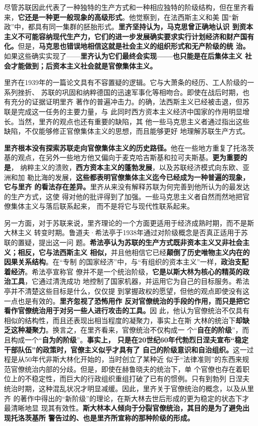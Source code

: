 尽管苏联因此代表了一种独特的生产方式和一种相应独特的阶级结构，但在里齐看
来，\textbf{它还是一种更一般现象的高级形式}。他觉察到，在法西斯主义和美
国“新政”中，都具有同一集群的胚胎形式。\textbf{里齐坚持认为，马克思曾正确地认识
  到资本主义不可能容纳现代生产力，它们的进一步发展确实要求实行计划经济和财产国有
  化。}但是，\textbf{马克思也错误地相信这就是社会主义的组织形式和无产阶级的统
  治。}如果这些确实实现了——\textbf{里齐认为它们最终会实现——也只能是在后集体主义
  社会才能做到；后资本主义社会就是官僚集体主义。}

里齐在1939年的一篇论文具有不容置疑的逻辑。它与大萧条的经历、工人阶级的一系列挫折、
苏联的巩固和纳粹德国的迅速军事化等相吻合。即使在战后时期，也有充分的证据证明里齐
著作的普遍冲击力。的确，法西斯主义已经被击退，但苏联是完成这一任务的主要力量，与
此同时西方资本主义经济中国家的作用明显增长。当然，里齐的观点也还有重要的缺陷，其
他一些马克思主义者通过指出这些缺陷，不仅能够修正官僚集体主义的思想，而且能够更好
地理解苏联生产方式。

\textbf{里齐根本没有探索苏联走向官僚集体主义的历史路径。}他在一些地方重复了托洛茨
基的观点，在另外一些地方他又偏向于麦克哈吉斯基和拉可夫斯基。\textbf{更为重要的是}，
纳粹主义的溃败，\textbf{西方资本主义的蓬勃发展}，以及苏联经济模式向东欧、亚洲和加
勒比海的发展，\textbf{这些都表明官僚集体主义迄今已经成为一种普遍的现象，它与里齐
  的看法存在差异。}里齐从来没有解释苏联为何完善到他所认为的最发达的生产方式，这使
得对他的批评得到了加强。一些马克思主义者自然而然地把官僚集体主义与落后联系起来，
而不是将它与现代性联系起来。

另一方面，对于苏联来说，里齐理论的一个方面更适用于经济成熟时期，而不是斯大林主义
转变时期。鲁道夫·希法亭于1938年通过对阶级概念是否真正适用于苏联的置疑，提出这一问
题。\textbf{希法亭认为苏联的生产方式既非资本主义又非社会主义；相反，它与法西斯主义
  相似，}并且他相信它已经\textbf{颠倒了历史唯物主义内在的因果关系结构}。在“专制
的国家经济”中，与“有组织的资本主义”一样，\textbf{政治支配着经济}。希法亭宣称官
僚并不是一个统治阶级，\textbf{它是以斯大林为核心的精英的政治工具}，它通过清洗成功
地控制了国家机器，并运用它为自己的目标服务。希法亭并不清楚这些目标是什么，仅仅提
到掌握政权的愿望，但他的观点即使没有这一点也是有效的。\textbf{里齐忽视了恐怖用作
  反对官僚统治的手段的作用，而只是把它看作官僚统治用于对另一些人进行攻击的工具。}因
此，他认为官僚统治不仅具有相似的结构性，而且还表现出相当程度的凝聚力，事实上在斯
大林的统治下\textbf{却缺乏这种凝聚力}。换言之，在里齐看来，官僚统治不仅构成一
个“\textbf{自在的阶级}”，而且构成一个“\textbf{自为的阶级}”。\textbf{事实上，
  只是在20世纪60年代勃烈日涅夫宣布“稳定干部队伍”的政策时，官僚主义似乎才具有了
  自己的阶级意识和自治组织。}这一过程是从50年代非斯大林化开始的，当时创立了某种近
似于“法律准则”的东西来规范官僚统治内部的分歧。但是，即使在赫鲁晓夫的统治下，单
个官僚也存在着职位上的不稳定性，而巨大的行政组织重组打破了已有的惯例。只有到勃列
日涅夫统治时期，这种混乱状况才明显减缓。因此，里齐关于官僚统治的概念，以及从里齐
的著作中得出的“新阶级”的理论，在斯大林去世后形成的更为稳定的状态下才最清晰地显
现其有效性。\textbf{斯大林本人倾向于分裂官僚统治，其目的是为了避免出现托洛茨基所
  警告过的、也是里齐所宣称的那种阶级的形成。}

